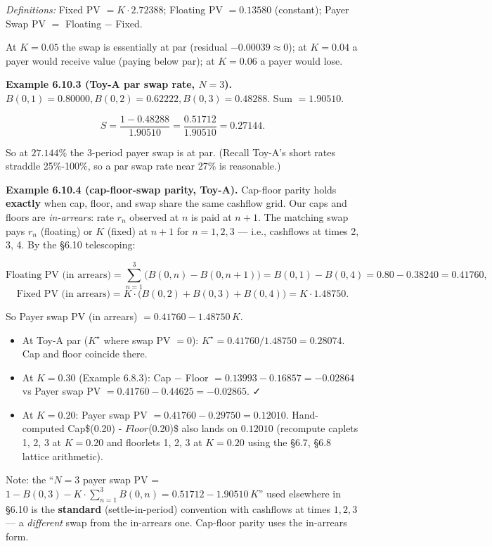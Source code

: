 \documentclass[
  10pt,
  twoside]{book}
\providecommand{\tightlist}{%
  \setlength{\itemsep}{0pt}\setlength{\parskip}{0pt}}
\begin{document}
\emph{Definitions:} Fixed PV \(= K \cdot 2.72388\); Floating PV
\(= 0.13580\) (constant); Payer Swap PV \(=\) Floating \(-\) Fixed.

At \(K = 0.05\) the swap is essentially at par (residual
\(-0.00039 \approx 0\)); at \(K = 0.04\) a payer would receive value
(paying below par); at \(K = 0.06\) a payer would lose.

\textbf{Example 6.10.3 (Toy-A par swap rate, \(N = 3\)).}
\(B(0, 1) = 0.80000, B(0, 2) = 0.62222, B(0, 3) = 0.48288\). Sum
\(= 1.90510\).

\[S = \frac{1 - 0.48288}{1.90510} = \frac{0.51712}{1.90510} = 0.27144.\]

So at \(27.144\%\) the 3-period payer swap is at par. (Recall Toy-A's
short rates straddle 25\%-100\%, so a par swap rate near 27\% is
reasonable.)

\textbf{Example 6.10.4 (cap-floor-swap parity, Toy-A).} Cap-floor parity
holds \textbf{exactly} when cap, floor, and swap share the same cashflow
grid. Our caps and floors are \emph{in-arrears}: rate \(r_n\) observed
at \(n\) is paid at \(n+1\). The matching swap pays \(r_n\) (floating)
or \(K\) (fixed) at \(n+1\) for \(n = 1, 2, 3\) --- i.e., cashflows at
times 2, 3, 4. By the §6.10 telescoping:

\[\text{Floating PV (in arrears)} = \sum_{n=1}^{3}\bigl(B(0,n) - B(0,n+1)\bigr) = B(0,1) - B(0,4) = 0.80 - 0.38240 = 0.41760,\]
\[\text{Fixed PV (in arrears)} = K \cdot \bigl(B(0,2)+B(0,3)+B(0,4)\bigr) = K \cdot 1.48750.\]

So Payer swap PV (in arrears) \(= 0.41760 - 1.48750\,K\).

\begin{itemize}
\tightlist
\item
  At Toy-A par (\(K^\star\) where swap PV \(= 0\)):
  \(K^\star = 0.41760/1.48750 = 0.28074\). Cap and floor coincide there.
\item
  At \(K = 0.30\) (Example 6.8.3): Cap \(-\) Floor
  \(= 0.13993 - 0.16857 = -0.02864\) vs Payer swap PV
  \(= 0.41760 - 0.44625 = -0.02865\). ✓
\item
  At \(K = 0.20\): Payer swap PV \(= 0.41760 - 0.29750 = 0.12010\).
  Hand-computed Cap\$(0.20) - \(Floor\)(0.20)\$ also lands on
  \(0.12010\) (recompute caplets 1, 2, 3 at \(K = 0.20\) and floorlets
  1, 2, 3 at \(K = 0.20\) using the §6.7, §6.8 lattice arithmetic).
\end{itemize}

Note: the ``\(N = 3\) payer swap PV =
\(1 - B(0, 3) - K \cdot \sum_{n=1}^{3}B(0, n) = 0.51712 - 1.90510\,K\)''
used elsewhere in §6.10 is the \textbf{standard} (settle-in-period)
convention with cashflows at times \(1, 2, 3\) --- a \emph{different}
swap from the in-arrears one. Cap-floor parity uses the in-arrears form.
\end{document}

